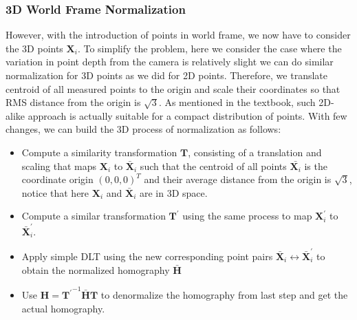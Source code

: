 \documentclass[conference]{IEEEtran}
\newcommand{\mat}[1]{\mathbf{#1}} %
\begin{document}
\subsubsection{3D World Frame Normalization}
However, with the introduction of points in world frame, we now have to consider the 3D points $\mat{X}_i$. To simplify the problem, here we consider the case where the variation in point depth from the camera is relatively slight we can do similar normalization for 3D points as we did for 2D points. Therefore, we translate centroid of all measured points to the origin and scale their coordinates so that RMS distance from the origin is $\sqrt{3}$. As mentioned in the textbook, such 2D-alike approach is actually suitable for a compact distribution of points. 
With few changes, we can build the 3D process of normalization as follows:
\begin{itemize}
	\item Compute a similarity transformation $\mat{T}$, consisting of a translation and scaling that maps $\mat{X}_i$ to $\bar{\mat{X}}_i$ such that the centroid of all points $\bar{\mat{X}_i}$ is the coordinate origin $(0, 0, 0)^T$ and their average distance from the origin is $\sqrt{3}$, notice that here $\mat{X}_i$ and $\bar{\mat{X}}_i$ are in 3D space.
	\item Compute a similar transformation $\mat{T}^\prime$ using the same process to map $\mat{X}_i^\prime$ to $\bar{\mat{X}}_i^\prime$.
	\item Apply simple DLT using the new corresponding point pairs $\bar{\mat{X}}_i\leftrightarrow \bar{\mat{X}}_i^\prime$ to obtain the normalized homography $\bar{\mat{H}}$
	\item Use $\mat{H} = {\mat{T}^\prime}^{-1}\bar{\mat{H}}\mat{T}$ to denormalize the homography from last step and get the actual homography.
\end{itemize}
\end{document}
